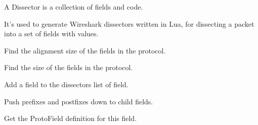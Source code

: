 \documentclass[A4paper,10pt,english]{sphinxmanual}
\begin{document}
\begin{fulllineitems}
\label{devel/code:dissector.Dissector}
A Dissector is a collection of fields and code.

It's used to generate Wireshark dissectors written in Lua, for
dissecting a packet into a set of fields with values.

\begin{fulllineitems}
\label{devel/code:dissector.Dissector.alignment}
Find the alignment size of the fields in the protocol.

\end{fulllineitems}


\begin{fulllineitems}
\label{devel/code:dissector.Dissector.size}
Find the size of the fields in the protocol.

\end{fulllineitems}


\begin{fulllineitems}
\label{devel/code:dissector.Dissector.add_field}
Add a field to the dissectors list of field.

\end{fulllineitems}


\begin{fulllineitems}
\label{devel/code:dissector.Dissector.push_modifiers}
Push prefixes and postfixes down to child fields.

\end{fulllineitems}


\begin{fulllineitems}
\label{devel/code:dissector.Dissector.get_definition}
Get the ProtoField definition for this field.


\end{fulllineitems}
\end{fulllineitems}
\end{document}
